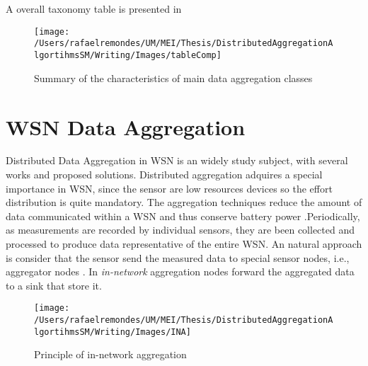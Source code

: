 \\
\\
A overall taxonomy table is presented in \cite{journals/corr/abs-1110-0725}

\begin{figure}[h]
\centering
\texttt{[image: /Users/rafaelremondes/UM/MEI/Thesis/DistributedAggregationAlgortihmsSM/Writing/Images/tableComp]}
\caption{\label{fig:TableTax} Summary of the characteristics of main data aggregation classes}
\end{figure}

\section{WSN Data Aggregation}
Distributed Data Aggregation in WSN is an widely study subject, with several works and proposed solutions. Distributed aggregation adquires a special importance in WSN, since the sensor are low resources devices so the effort distribution is quite mandatory. The aggregation techniques reduce the amount of data communicated within a WSN and thus conserve battery power \cite{castelluccia2005efficient}.Periodically, as measurements are recorded by individual sensors, they are been collected and processed to produce data representative of the entire WSN.  An natural approach is consider that the sensor send the measured data to special sensor nodes, i.e., aggregator nodes \cite{castelluccia2005efficient}. In \textit{in-network} aggregation nodes forward the aggregated data to a sink that store it.\\
\begin{figure}[h]
\centering
\texttt{[image: /Users/rafaelremondes/UM/MEI/Thesis/DistributedAggregationAlgortihmsSM/Writing/Images/INA]}
\caption{\label{fig:INAaggregation} Principle of in-network aggregation}
\end{figure}
